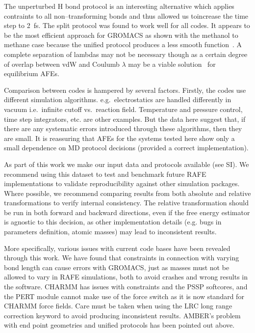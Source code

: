 \documentclass[journal=jctcce,manuscript=article]{achemso}
\begin{document}
The unperturbed H bond protocol is an interesting alternative which
applies contraints to all non--transforming bonds and thus allowed us toincrease the time step to \SI{2}{fs}.
 The split protocol was found to work  well for all codes.
  It appears to be the most efficient
approach for GROMACS as shown with the methanol to methane case because the unified protocol produces a less smooth function~\cite{shirts_chapter_2007}.
A complete separation of lambdas may not be necessary though as a certain degree of overlap between vdW and Coulumb $\lambda$ may be a viable
solution~\cite{procacci_fast_2014} for equilibrium AFEs. %

Comparison between codes is hampered by several factors.  Firstly, the codes use different simulation algorithms.  e.g.\
electrostatics are handled differently in vacuum i.e.\ infinite cutoff vs.\
reaction field.  Temperature and pressure control, time step integrators, etc. are other examples.  But the data here suggest that, if there are any systematic errors introduced through these algorithms, then they are small.  It is reassuring that AFEs for the systems tested here show only a small dependence on MD protocol decisions (provided a correct implementation).

As part of this work we make our input data and protocols available (see SI).  We recommend using this dataset to test and benchmark future RAFE implementations to validate reproducibility against other simulation packages.
Where possible, we recommend comparing results from both absolute and relative transformations to verify internal consistency.
The relative transformation should be run in both forward and backward directions, even if the free energy estimator is agnostic to this decision, as other implementation details (e.g. bugs in parameters definition, atomic masses) may lead to inconsistent results.

More specifically, various issues with current code bases have been revealed through this work.
We have found that constraints in connection with varying bond length can cause errors with GROMACS, just as masses must not be allowed to vary in RAFE simulations, both to avoid crashes and wrong results in the
software.  CHARMM has issues with constraints and the PSSP softcores, and the PERT module cannot make use of the force switch as it is now standard for CHARMM force fields. Care must be taken when using the LRC long range correction keyword to avoid producing inconsistent results.  AMBER's problem with end point geometries and unified protocols has been pointed out above.
\end{document}
